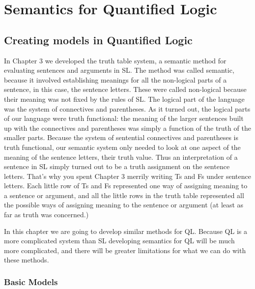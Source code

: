 \chapter{Semantics for Quantified Logic}
\label{chap:semantics_for_ql}
\setlength{\parindent}{1em}


\section{Creating models in Quantified Logic}

In Chapter 3 we developed the truth table system, a semantic method for evaluating sentences and arguments in SL. The method was called semantic, because it involved establishing meanings for all the non-logical parts of a sentence, in this case, the sentence letters. These were called non-logical because their meaning was not fixed by the rules of SL. The logical part of the language was the system of connectives and parentheses. As it turned out, the logical parts of our language were truth functional: the meaning of the larger sentences built up with the connectives and parentheses was simply a function of the truth of the smaller parts. Because the system of sentential connectives and parentheses is truth functional, our semantic system only needed to look at one aspect of the meaning of the sentence letters, their truth value. Thus an interpretation of a sentence in SL simply turned out to be a truth assignment on the sentence letters. That's why you spent Chapter 3 merrily writing Ts and Fs under sentence letters. Each little row of Ts and Fs represented one way of assigning meaning to a sentence or argument, and all the little rows in the truth table represented all the possible ways of assigning meaning to the sentence or argument (at least as far as truth was concerned.) 

In this chapter we are going to develop similar methods for QL. Because QL is a more complicated system than SL developing semantics for QL will be much more complicated, and there will be greater limitations for what we can do with these methods.

\subsection{Basic Models}

